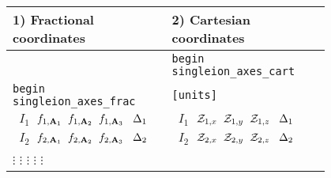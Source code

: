 \documentclass[10pt]{report}
\def\la{\large}
\begin{document}
\begin{itemize}
\begin{center}
    \begin{tabular}{p{0.4\linewidth}p{0.4\linewidth}}
        \toprule
        \multicolumn{1}{l}{\la 1) Fractional coordinates} & \multicolumn{1}{l}{\la 2) Cartesian coordinates} \\ \midrule
                                 & {\tt begin singleion\_axes\_cart} \\
         {\tt begin singleion\_axes\_frac} & {\tt [units]}                   \\
        {\tt \hspace{0.2cm} $I_{1}$\hspace{0.3cm}  $ f_{1,\textbf{A}_1} \hspace{0.2cm} f_{1,\textbf{A}_2} \hspace{0.2cm} f_{1,\textbf{A}_3} \hspace{0.3cm} \Delta_{1} $}  &
        {\tt \hspace{0.2cm} $I_{1}$\hspace{0.3cm}  $ \mathcal{Z}_{1,x} \hspace{0.2cm} \mathcal{Z}_{1,y} \hspace{0.2cm} \mathcal{Z}_{1,z}\hspace{0.3cm} \Delta_{1} $}  \\
        {\tt \hspace{0.2cm} $I_{2}$\hspace{0.3cm}  $ f_{2,\textbf{A}_1} \hspace{0.2cm} f_{2,\textbf{A}_2} \hspace{0.2cm} f_{2,\textbf{A}_3} \hspace{0.3cm} \Delta_{2} $}  &
        {\tt \hspace{0.2cm} $I_{2}$\hspace{0.3cm}  $ \mathcal{Z}_{2,x} \hspace{0.2cm} \mathcal{Z}_{2,y} \hspace{0.2cm} \mathcal{Z}_{2,z}\hspace{0.3cm} \Delta_{2} $}  \\
           \hspace{0.3cm}  $\vdots$ \hspace{0.9cm}    $\vdots$ \hspace{0.45cm} $\vdots$ \hspace{0.45cm} $\vdots$ \hspace{0.55cm} $\vdots$             &   

\end{tabular}
\end{center}
\end{itemize}
\end{document}
